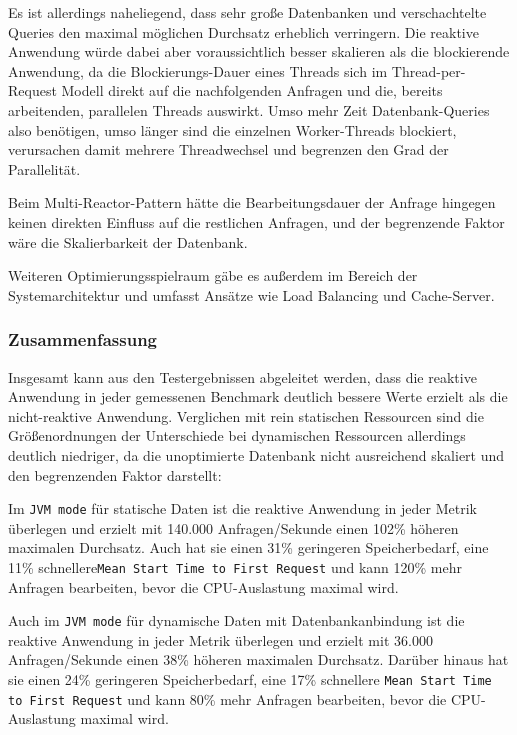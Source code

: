 Es ist allerdings naheliegend, dass sehr große Datenbanken und verschachtelte Queries den maximal möglichen Durchsatz erheblich verringern.
Die reaktive Anwendung würde dabei aber voraussichtlich besser skalieren als die blockierende Anwendung, da die Blockierungs-Dauer
eines Threads sich im Thread-per-Request Modell direkt auf die nachfolgenden Anfragen und die, bereits arbeitenden, parallelen Threads
auswirkt. Umso mehr Zeit Datenbank-Queries also benötigen, umso länger sind die einzelnen Worker-Threads blockiert, verursachen damit
mehrere Threadwechsel und begrenzen den Grad der Parallelität.

Beim Multi-Reactor-Pattern hätte die Bearbeitungsdauer der Anfrage hingegen keinen direkten Einfluss auf die restlichen Anfragen, und der
begrenzende Faktor wäre die Skalierbarkeit der Datenbank.

Weiteren Optimierungsspielraum gäbe es außerdem im Bereich der Systemarchitektur und umfasst Ansätze wie Load Balancing und Cache-Server.
\subsubsection{Zusammenfassung}
\label{subsubsec:auswertung_zusammenfassung}
Insgesamt kann aus den Testergebnissen abgeleitet werden, dass die reaktive Anwendung in jeder gemessenen
Benchmark deutlich bessere Werte erzielt als die nicht-reaktive Anwendung.
Verglichen mit rein statischen Ressourcen sind die Größenordnungen der Unterschiede bei dynamischen Ressourcen allerdings deutlich niedriger,
da die unoptimierte Datenbank nicht ausreichend skaliert und den begrenzenden Faktor darstellt:

Im \verb|JVM mode| für statische Daten ist die reaktive Anwendung in jeder Metrik überlegen und erzielt mit 140.000 Anfragen/Sekunde
einen 102\% höheren maximalen Durchsatz.
Auch hat sie einen 31\% geringeren Speicherbedarf, eine 11\% schnellere\newline \verb|Mean Start Time to First Request| und kann 120\% mehr Anfragen bearbeiten,
bevor die CPU-Auslastung maximal wird.

Auch im \verb|JVM mode| für dynamische Daten mit Datenbankanbindung ist die reaktive Anwendung in jeder Metrik überlegen und erzielt
mit 36.000 Anfragen/Sekunde einen 38\% höheren maximalen Durchsatz. Darüber hinaus hat sie einen 24\% geringeren Speicherbedarf, eine 17\% schnellere
\verb|Mean Start Time to First Request| und kann 80\% mehr Anfragen bearbeiten, bevor die CPU-Auslastung maximal wird.\newline

